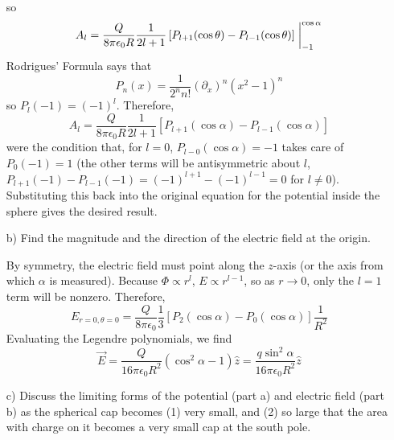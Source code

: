 \documentclass[a4paper,twoside]{article}
\begin{document}
\begin{itemize}
\begin{tcolorbox}[breakable]
    so
    \begin{equation}
        A_l = \frac{Q}{8\pi\epsilon_0 R}\frac{1}{2l+1}\left[ P_{l+1}(\cos\theta) - P_{l-1}(\cos\theta) \right]\eval_{-1}^{\cos\alpha}
    \end{equation}
    Rodrigues' Formula says that
    \begin{equation}
        P_n(x) = \frac{1}{2^n n!}(\partial_x)^n (x^2-1)^n
    \end{equation}
    so $P_l(-1) = (-1)^l$. Therefore,
    \begin{equation}
        A_l = \frac{Q}{8\pi\epsilon_0 R}\frac{1}{2l+1}\left[ P_{l+1}(\cos\alpha) - P_{l-1}(\cos\alpha) \right]
    \end{equation}
    were the condition that, for $l=0$, $P_{l-0}(\cos\alpha) = -1$ takes care of $P_0(-1) = 1$ (the other terms will be antisymmetric about $l$, $P_{l+1}(-1)-P_{l-1}(-1) = (-1)^{l+1}-(-1)^{l-1} = 0$ for $l\neq 0$).
    Substituting this back into the original equation for the potential inside the sphere gives the desired result.
\end{tcolorbox}

    \item[b)] Find the magnitude and the direction of the electric field at the origin.

        \begin{tcolorbox}[breakable]
            By symmetry, the electric field must point along the $z$-axis (or the axis from which $\alpha$ is measured). Because $\Phi\propto r^l$, $E\propto r^{l-1}$, so as $r\to 0$, only the $l=1$ term will be nonzero. Therefore,
            \begin{equation}
                E_{r=0,\theta=0} = \frac{Q}{8\pi\epsilon_0} \frac{1}{3}[P_2(\cos\alpha)-P_0(\cos\alpha)] \frac{1}{R^2}
            \end{equation}
            Evaluating the Legendre polynomials, we find
            \begin{equation}
                \vec{E} = \frac{Q}{16\pi\epsilon_0 R^2}(\cos^2\alpha - 1)\hat{z} = \frac{q\sin^2\alpha}{16\pi\epsilon_0 R^2}\hat{z}
            \end{equation}
        \end{tcolorbox}

    \item[c)] Discuss the limiting forms of the potential (part a) and electric field (part b) as the spherical cap becomes (1) very small, and (2) so large that the area with charge on it becomes a very small cap at the south pole.


\end{itemize}
\end{document}
